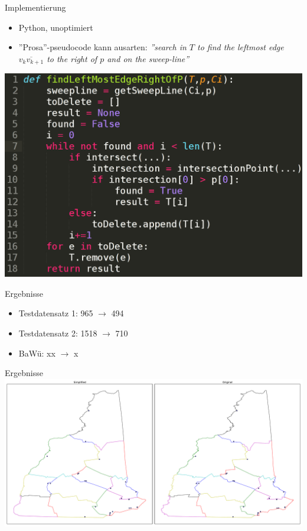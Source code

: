 \documentclass[14pt]{beamer}
\begin{document}
\begin{frame}{Implementierung}
\begin{itemize}
	\item Python, unoptimiert
	\item ''Prosa''-pseudocode kann ausarten: \emph{''search in $T$ to find the leftmost edge $\overline{v_kv_{k+1}}$ to the right of $p$ and on the
sweep-line''}
\end{itemize}

\includegraphics[width=.8\textwidth,center]{img/implvspseudo.png}
\end{frame}

\begin{frame}{Ergebnisse}
\begin{itemize}
	\item Testdatensatz 1: 965 $\rightarrow$ 494
	\item Testdatensatz 2: 1518 $\rightarrow$ 710
	\item BaWü: xx $\rightarrow$ x
\end{itemize}
\end{frame}

\begin{frame}{Ergebnisse}
\includegraphics[width=1.25\textwidth,center]{img/result_dataset1.pdf}
\end{frame}
\end{document}
